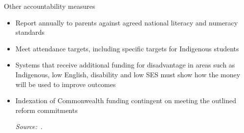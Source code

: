 Other accountability measures 
 \begin{itemize}
 \item Report annually to parents against agreed national literacy and numeracy standards
 \item Meet attendance targets, including specific targets for Indigenous students
 \item Systems that receive additional funding for disadvantage in areas such as Indigenous, low English, disability and low SES must show how the money will be used to improve outcomes 
 \item Indexation of Commonwealth funding contingent on meeting the outlined reform commitments\par
  {\footnotesize\textit{Source:}~\textcite{2016AustralianGovernmentQualitySchoolsQualityOutcomes}.\par}

\end{itemize}


